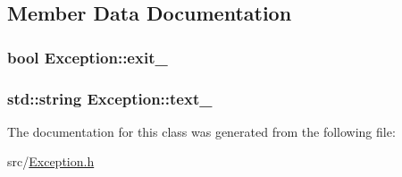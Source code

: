 \subsection{\-Member \-Data \-Documentation}
\hypertarget{classException_a9cf33974b959577efbd947d14e8f4590}{
\subsubsection[{exit\-\_\-}]{\setlength{\rightskip}{0pt plus 5cm}bool {\bf \-Exception\-::exit\-\_\-}}}\label{d4/d67/classException_a9cf33974b959577efbd947d14e8f4590}
\hypertarget{classException_a404e79b557f64d95acfb5dccbb864860}{
\subsubsection[{text\-\_\-}]{\setlength{\rightskip}{0pt plus 5cm}std\-::string {\bf \-Exception\-::text\-\_\-}}}\label{d4/d67/classException_a404e79b557f64d95acfb5dccbb864860}


\-The documentation for this class was generated from the following file\-:\begin{DoxyCompactItemize}
\item 
src/\hyperlink{Exception_8h}{\-Exception.\-h}\end{DoxyCompactItemize}
